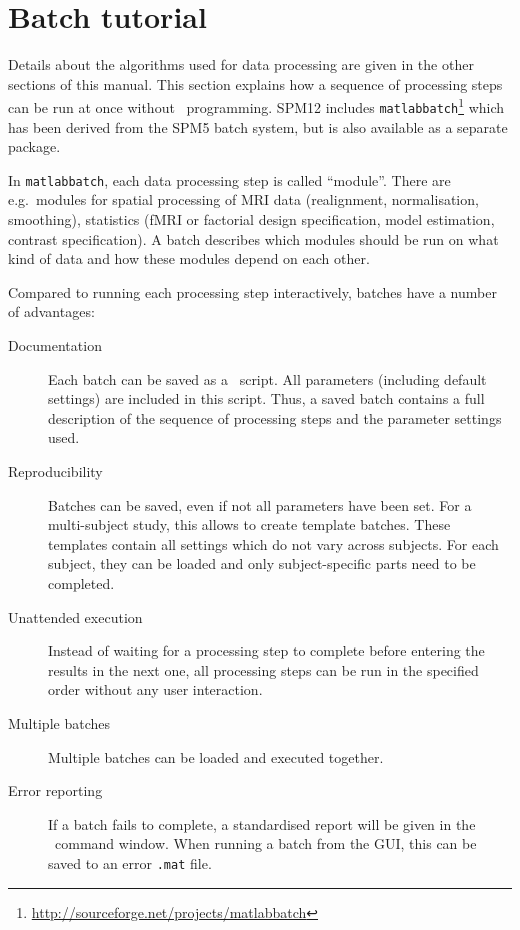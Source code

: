 \chapter{Batch tutorial}
\label{Chap:batch:tutorial}

Details about the algorithms used for data processing are given in the other
sections of this manual. This section explains how a sequence of processing
steps can be run at once without \matlab\ programming. SPM12 includes
\texttt{matlabbatch}\footnote{\url{http://sourceforge.net/projects/matlabbatch}}
which has been derived from the SPM5 batch system, but is also available as a
separate package.

In \texttt{matlabbatch}, each data processing step is called ``module''. There
are e.g.\ modules for spatial processing of MRI data (realignment,
normalisation, smoothing), statistics (fMRI or factorial design specification,
model estimation, contrast specification). A batch describes which modules
should be run on what kind of data and how these modules depend on each other.

Compared to running each processing step interactively, batches have a number
of advantages:
\begin{description}
\item[Documentation] Each batch can be saved as a \matlab\ script. All
  parameters (including default settings) are included in this script. Thus, a
  saved batch contains a full description of the sequence of processing steps
  and the parameter settings used.
\item[Reproducibility] Batches can be saved, even if not all parameters have
  been set. For a multi-subject study, this allows to create template batches.
  These templates contain all settings which do not vary across subjects. For
  each subject, they can be loaded and only subject-specific parts need to be
  completed.
\item[Unattended execution] Instead of waiting for a processing step to
  complete before entering the results in the next one, all processing steps
  can be run in the specified order without any user interaction.
\item[Multiple batches] Multiple batches can be loaded and executed together.
\item[Error reporting] If a batch fails to complete, a standardised report
  will be given in the \matlab\ command window.
  When running a batch from the GUI, this can be saved to an error \verb|.mat| file.
\end{description}


